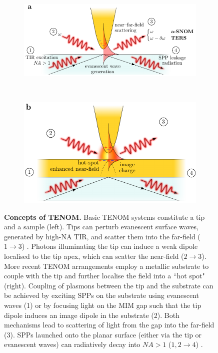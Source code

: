 \documentclass{article}
\begin{document}
\begin{figure}[bt]
\begin{singlespace}
\centering
\begin{subfigure}[t]{0.49\textwidth}
	\includegraphics[scale=1.05]{figures/tenom_basic}
\end{subfigure}
~
\begin{subfigure}[t]{0.47\textwidth}
	\includegraphics[scale=1.05]{figures/tenom_surface}
\end{subfigure}
\end{singlespace}
\caption[Concepts of TENOM]{\textbf{Concepts of TENOM.} Basic TENOM systems constitute a tip and a sample (left). Tips can perturb evanescent surface waves, generated by high-NA TIR, and scatter them into the far-field ($1\rightarrow3$) \cite{neacsu2005, mehtani2006}. Photons illuminating the tip can induce a weak dipole localised to the tip apex, which can scatter the near-field ($2\rightarrow3$). More recent TENOM arrangements employ a metallic substrate to couple with the tip and further localise the field into a ``hot spot" (right). Coupling of plasmons between the tip and the substrate can be achieved by exciting SPPs on the substrate using evanescent waves (1) or by focusing light on the MIM gap such that the tip dipole induces an image dipole in the substrate (2). Both mechanisms lead to scattering of light from the gap into the far-field (3). SPPs launched onto the planar surface (either via the tip or evanescent waves) can radiatively decay into $\mathit{NA}>1$ ($1,2\rightarrow4$) \cite{wang2011}.}
\label{fig:tenom_concept}
\end{figure}
\end{document}
